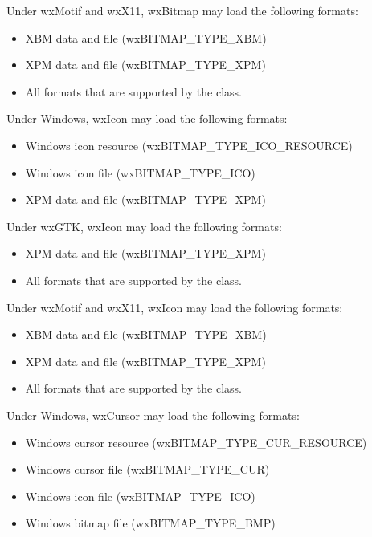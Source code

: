 Under wxMotif and wxX11, wxBitmap may load the following formats:

\begin{itemize}\itemsep=0pt
\item XBM data and file (wxBITMAP\_TYPE\_XBM)
\item XPM data and file (wxBITMAP\_TYPE\_XPM)
\item All formats that are supported by the  class.
\end{itemize}


Under Windows, wxIcon may load the following formats:

\begin{itemize}\itemsep=0pt
\item Windows icon resource (wxBITMAP\_TYPE\_ICO\_RESOURCE)
\item Windows icon file (wxBITMAP\_TYPE\_ICO)
\item XPM data and file (wxBITMAP\_TYPE\_XPM)
\end{itemize}

Under wxGTK, wxIcon may load the following formats:

\begin{itemize}\itemsep=0pt
\item XPM data and file (wxBITMAP\_TYPE\_XPM)
\item All formats that are supported by the  class.
\end{itemize}

Under wxMotif and wxX11, wxIcon may load the following formats:

\begin{itemize}\itemsep=0pt
\item XBM data and file (wxBITMAP\_TYPE\_XBM)
\item XPM data and file (wxBITMAP\_TYPE\_XPM)
\item All formats that are supported by the  class.
\end{itemize}


Under Windows, wxCursor may load the following formats:

\begin{itemize}\itemsep=0pt
\item Windows cursor resource (wxBITMAP\_TYPE\_CUR\_RESOURCE)
\item Windows cursor file (wxBITMAP\_TYPE\_CUR)
\item Windows icon file (wxBITMAP\_TYPE\_ICO)
\item Windows bitmap file (wxBITMAP\_TYPE\_BMP)
\end{itemize}

